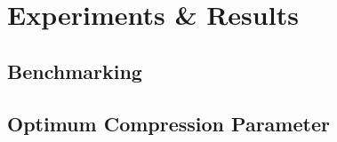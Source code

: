 \chapter{Experiments \& Results}\label{chpt:3}
\section{Benchmarking}\label{sec:3_1_benchmarking}

\section{Optimum Compression Parameter}\label{sec:3_2_svd_params}
